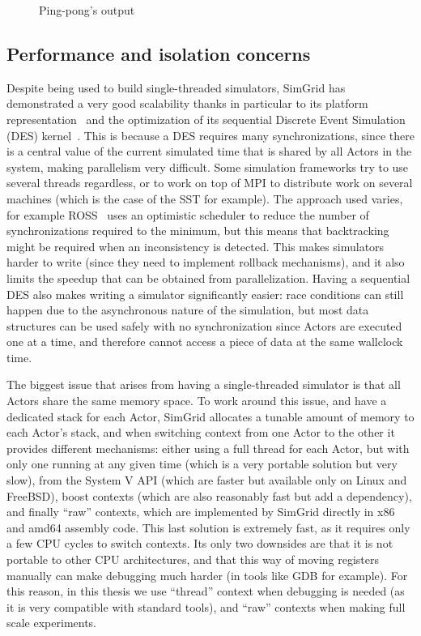 \begin{figure}[!t]
    
    \caption{Ping-pong's output}
    \label{fig:3_related_work_simu:Pingpong_output}
\end{figure}

\subsection{Performance and isolation concerns}

Despite being used to build single-threaded simulators, SimGrid has demonstrated
a very good scalability thanks in particular to its platform
representation~\cite{Bobelin2012} and the optimization of its sequential
Discrete Event Simulation (DES) kernel~\cite{Degomme2017a}. This is because a
DES requires many synchronizations, since there is a central value of the
current simulated time that is shared by all Actors in the system, making
parallelism very difficult. Some simulation frameworks try to use several
threads regardless, or to work on top of MPI to distribute work on several
machines (which is the case of the SST for example). The approach used varies,
for example ROSS~\cite{Carothers2002} uses an optimistic scheduler to reduce the
number of synchronizations required to the minimum, but this means that
backtracking might be required when an inconsistency is detected. This makes
simulators harder to write (since they need to implement rollback mechanisms),
and it also limits the speedup that can be obtained from parallelization. Having
a sequential DES also makes writing a simulator significantly easier: race
conditions can still happen due to the asynchronous nature of the simulation,
but most data structures can be used safely with no synchronization since Actors
are executed one at a time, and therefore cannot access a piece of data at the
same wallclock time.

The biggest issue that arises from having a single-threaded simulator is that
all Actors share the same memory space. To work around this issue, and have a
dedicated stack for each Actor, SimGrid allocates a tunable amount of memory to
each Actor's stack, and when switching context from one Actor to the other it
provides different mechanisms: either using a full thread for each Actor, but
with only one running at any given time (which is a very portable solution but
very slow),  from the System V API (which are faster but
available only on Linux and FreeBSD), boost contexts (which are also reasonably
fast but add a dependency), and finally ``raw'' contexts, which are implemented
by SimGrid directly in x86 and amd64 assembly code. This last solution is
extremely fast, as it requires only a few CPU cycles to switch contexts. Its
only two downsides are that it is not portable to other CPU architectures, and
that this way of moving registers manually can make debugging much harder (in
tools like GDB for example). For this reason, in this thesis we use ``thread''
context when debugging is needed (as it is very compatible with standard tools),
and ``raw'' contexts when making full scale experiments.

